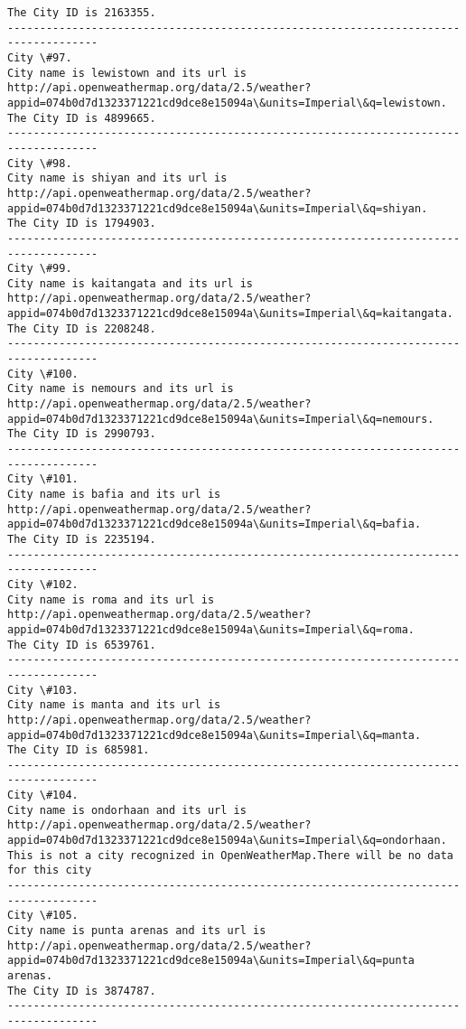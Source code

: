 \documentclass[11pt]{article}
\begin{document}
\begin{Verbatim}[commandchars=\\\{\}]
The City ID is 2163355.
------------------------------------------------------------------------------------
City \#97.
City name is lewistown and its url is http://api.openweathermap.org/data/2.5/weather?appid=074b0d7d1323371221cd9dce8e15094a\&units=Imperial\&q=lewistown.
The City ID is 4899665.
------------------------------------------------------------------------------------
City \#98.
City name is shiyan and its url is http://api.openweathermap.org/data/2.5/weather?appid=074b0d7d1323371221cd9dce8e15094a\&units=Imperial\&q=shiyan.
The City ID is 1794903.
------------------------------------------------------------------------------------
City \#99.
City name is kaitangata and its url is http://api.openweathermap.org/data/2.5/weather?appid=074b0d7d1323371221cd9dce8e15094a\&units=Imperial\&q=kaitangata.
The City ID is 2208248.
------------------------------------------------------------------------------------
City \#100.
City name is nemours and its url is http://api.openweathermap.org/data/2.5/weather?appid=074b0d7d1323371221cd9dce8e15094a\&units=Imperial\&q=nemours.
The City ID is 2990793.
------------------------------------------------------------------------------------
City \#101.
City name is bafia and its url is http://api.openweathermap.org/data/2.5/weather?appid=074b0d7d1323371221cd9dce8e15094a\&units=Imperial\&q=bafia.
The City ID is 2235194.
------------------------------------------------------------------------------------
City \#102.
City name is roma and its url is http://api.openweathermap.org/data/2.5/weather?appid=074b0d7d1323371221cd9dce8e15094a\&units=Imperial\&q=roma.
The City ID is 6539761.
------------------------------------------------------------------------------------
City \#103.
City name is manta and its url is http://api.openweathermap.org/data/2.5/weather?appid=074b0d7d1323371221cd9dce8e15094a\&units=Imperial\&q=manta.
The City ID is 685981.
------------------------------------------------------------------------------------
City \#104.
City name is ondorhaan and its url is http://api.openweathermap.org/data/2.5/weather?appid=074b0d7d1323371221cd9dce8e15094a\&units=Imperial\&q=ondorhaan.
This is not a city recognized in OpenWeatherMap.There will be no data for this city
------------------------------------------------------------------------------------
City \#105.
City name is punta arenas and its url is http://api.openweathermap.org/data/2.5/weather?appid=074b0d7d1323371221cd9dce8e15094a\&units=Imperial\&q=punta arenas.
The City ID is 3874787.
------------------------------------------------------------------------------------

\end{Verbatim}
\end{document}
